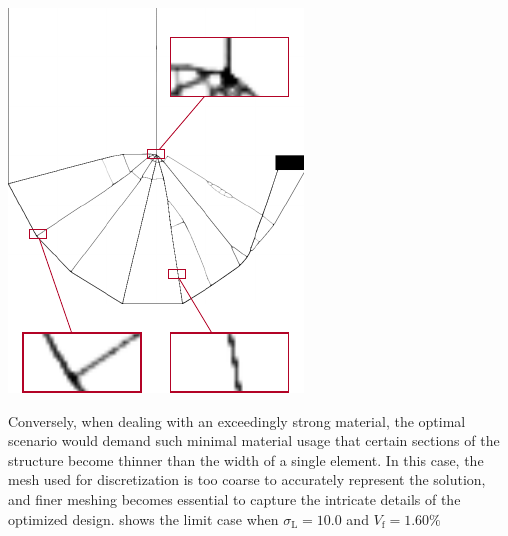 \begin{marginfigure}
    \centering
    \includegraphics[width=0.8\linewidth]{figures/03_comparison_TO_TTO/00_to_zoom/to_zoom.pdf}
    \caption{}
    \label{fig:03_to_sol_zoom}
\end{marginfigure}
Conversely, when dealing with an exceedingly strong material, the optimal scenario would demand such minimal material usage that certain sections of the structure become thinner than the width of a single element. In this case, the mesh used for discretization is too coarse to accurately represent the solution, and finer meshing becomes essential to capture the intricate details of the optimized design.  shows
the limit case when $\sigma_\text{L}=10.0$ and $ V_\text{f}=1.60\%$ 

